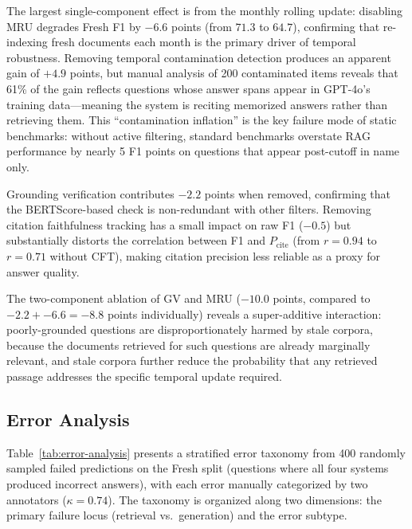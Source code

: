 The largest single-component effect is from the monthly rolling update: disabling MRU degrades Fresh F1 by $-6.6$ points (from $71.3$ to $64.7$), confirming that re-indexing fresh documents each month is the primary driver of temporal robustness. Removing temporal contamination detection produces an apparent gain of $+4.9$ points, but manual analysis of 200 contaminated items reveals that 61\% of the gain reflects questions whose answer spans appear in GPT-4o's training data---meaning the system is reciting memorized answers rather than retrieving them. This ``contamination inflation'' is the key failure mode of static benchmarks: without active filtering, standard benchmarks overstate RAG performance by nearly 5 F1 points on questions that appear post-cutoff in name only.

Grounding verification contributes $-2.2$ points when removed, confirming that the BERTScore-based check is non-redundant with other filters. Removing citation faithfulness tracking has a small impact on raw F1 ($-0.5$) but substantially distorts the correlation between F1 and $P_{\text{cite}}$ (from $r = 0.94$ to $r = 0.71$ without CFT), making citation precision less reliable as a proxy for answer quality.

The two-component ablation of GV and MRU ($-10.0$ points, compared to $-2.2 + -6.6 = -8.8$ points individually) reveals a super-additive interaction: poorly-grounded questions are disproportionately harmed by stale corpora, because the documents retrieved for such questions are already marginally relevant, and stale corpora further reduce the probability that any retrieved passage addresses the specific temporal update required.

\subsection{Error Analysis}

Table~\ref{tab:error-analysis} presents a stratified error taxonomy from 400 randomly sampled failed predictions on the Fresh split (questions where all four systems produced incorrect answers), with each error manually categorized by two annotators ($\kappa = 0.74$). The taxonomy is organized along two dimensions: the primary failure locus (retrieval vs.\ generation) and the error subtype.

